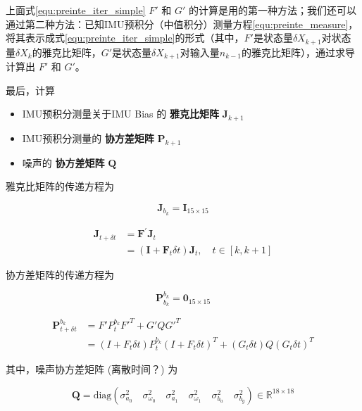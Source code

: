 \documentclass[12pt,a4paper]{article}
\begin{document}
上面式\eqref{equ:preinte_iter_simple} $F'$ 和 $G'$ 的计算是用的第一种方法；我们还可以通过第二种方法：已知IMU预积分（中值积分）测量方程\eqref{equ:preinte_measure}，将其表示成式\eqref{equ:preinte_iter_simple}的形式（其中，$F'$是状态量$\delta X_{k+1}$对状态量$\delta X_k$的雅克比矩阵，$G'$是状态量$\delta X_{k+1}$对输入量$n_{k-1}$的雅克比矩阵），通过求导计算出 $F'$ 和 $G'$。

最后，计算

\begin{itemize}[itemindent=1em]
  \item IMU预积分测量关于IMU Bias 的 \textbf{雅克比矩阵} $\mathbf{J}_{k+1}$
  \item IMU预积分测量的 \textbf{协方差矩阵} $\mathbf{P}_{k+1}$
  \item 噪声的 \textbf{协方差矩阵} $\mathbf{Q}$
\end{itemize}

雅克比矩阵的传递方程为

\begin{equation}
\mathbf{J}_{b_k} = \mathbf{I}_{15 \times 15}
\end{equation}

\begin{equation}
\begin{aligned}
\mathbf{J}_{t+\delta t} 
&= 
\mathbf{F^{\prime}} \mathbf{J}_t \\
&= 
(\mathbf{I} + \mathbf{F}_t \delta t) \mathbf{J}_t, \quad t \in [k, k+1]
\end{aligned}
\end{equation}

协方差矩阵的传递方程为

\begin{equation}
\mathbf{P}_{b_{k}}^{b_k} = \mathbf{0}_{15 \times 15}
\end{equation}

\begin{equation}
\begin{aligned}
\mathbf{P}_{t+\delta t}^{b_k} 
&= 
F' P_t^{b_k} F'^T + G' Q {G'}^T \\
&= 
(I + F_t \delta t)P_{t}^{b_k}(I + F_t \delta t)^T + (G_t \delta t)Q(G_t \delta t)^T
\end{aligned}
\end{equation}

其中，噪声协方差矩阵 (离散时间？) 为

\begin{equation}
\mathbf{Q} = 
\text{diag}(
  \sigma_{a_0}^2 \quad \sigma_{\omega_0}^2 \quad
  \sigma_{a_1}^2 \quad \sigma_{\omega_1}^2 \quad
  \sigma_{b_a}^2 \quad \sigma_{b_g}^2) 
\in \mathbb{R}^{18 \times 18}
\end{equation}
\end{document}
